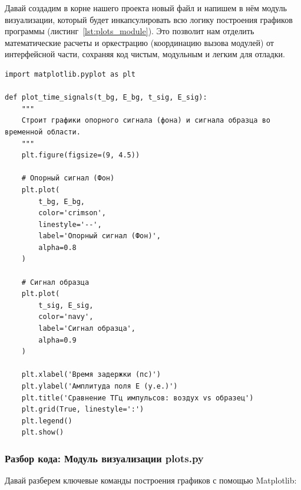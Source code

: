Давай создадим в корне нашего проекта новый файл  и напишем в нём модуль визуализации, который будет инкапсулировать всю логику построения графиков программы (листинг~\ref{lst:plots_module}). Это позволит нам отделить математические расчеты и оркестрацию (координацию вызова модулей) от интерфейсной части, сохраняя код чистым, модульным и легким для отладки.

\begin{listing}[H]
	\caption{Модуль визуализации сигналов ()}\label{lst:plots_module}
	\begin{verbatim}
import matplotlib.pyplot as plt

def plot_time_signals(t_bg, E_bg, t_sig, E_sig):
    """
    Строит графики опорного сигнала (фона) и сигнала образца во временной области.
    """
    plt.figure(figsize=(9, 4.5))

    # Опорный сигнал (Фон)
    plt.plot(
        t_bg, E_bg,
        color='crimson',
        linestyle='--',
        label='Опорный сигнал (Фон)',
        alpha=0.8
    )

    # Сигнал образца
    plt.plot(
        t_sig, E_sig,
        color='navy',
        label='Сигнал образца',
        alpha=0.9
    )

    plt.xlabel('Время задержки (пс)')
    plt.ylabel('Амплитуда поля E (у.е.)')
    plt.title('Сравнение ТГц импульсов: воздух vs образец')
    plt.grid(True, linestyle=':')
    plt.legend()
    plt.show()
	\end{verbatim}
\end{listing}

\subsubsection{Разбор кода: Модуль визуализации plots.py}

Давай разберем ключевые команды построения графиков с помощью Matplotlib:

